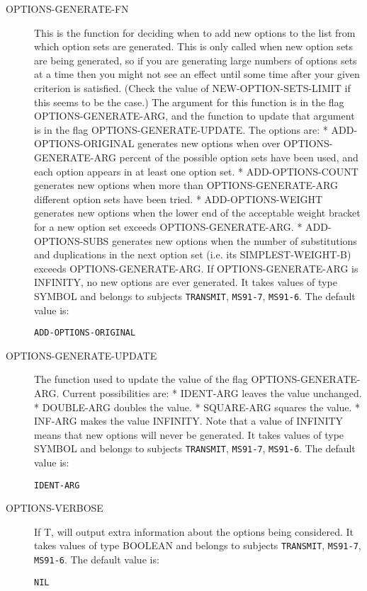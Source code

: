 \begin{description}
\item[OPTIONS-GENERATE-FN]  
This is the function for deciding when to add new options
to the list from which option sets are generated. This is only called 
when new option sets are being generated, so if you are generating large
numbers of options sets at a time then you might not see an effect until
some time after your given criterion is satisfied. (Check the value of
NEW-OPTION-SETS-LIMIT if this seems to be the case.) The argument for 
this function is in the flag OPTIONS-GENERATE-ARG, and the function
to update that argument is in the flag OPTIONS-GENERATE-UPDATE.
The options are:
* ADD-OPTIONS-ORIGINAL generates new options when over 
  OPTIONS-GENERATE-ARG percent of the possible option sets have been 
  used, and each option appears in at least one option set.
* ADD-OPTIONS-COUNT generates new options when more than 
  OPTIONS-GENERATE-ARG different option sets have been tried.
* ADD-OPTIONS-WEIGHT generates new options when the lower end of the
  acceptable weight bracket for a new option set exceeds 
  OPTIONS-GENERATE-ARG.
* ADD-OPTIONS-SUBS generates new options when the number of 
  substitutions and duplications in the next option set (i.e.
  its SIMPLEST-WEIGHT-B) exceeds OPTIONS-GENERATE-ARG.
If OPTIONS-GENERATE-ARG is INFINITY, no new options are ever generated.
It takes values of type SYMBOL and belongs to subjects \texttt{TRANSMIT}, \texttt{MS91-7}, \texttt{MS91-6}.  The default value is: \begin{lstlisting}
ADD-OPTIONS-ORIGINAL
\end{lstlisting}

\item[OPTIONS-GENERATE-UPDATE]  
The function used to update the value of the flag
OPTIONS-GENERATE-ARG. Current possibilities are:
* IDENT-ARG leaves the value unchanged.
* DOUBLE-ARG doubles the value.
* SQUARE-ARG squares the value.
* INF-ARG makes the value INFINITY.
Note that a value of INFINITY means that new options will never be 
generated.
It takes values of type SYMBOL and belongs to subjects \texttt{TRANSMIT}, \texttt{MS91-7}, \texttt{MS91-6}.  The default value is: \begin{lstlisting}
IDENT-ARG
\end{lstlisting}

\item[OPTIONS-VERBOSE]  
If T, will output extra information about the options being 
considered.
It takes values of type BOOLEAN and belongs to subjects \texttt{TRANSMIT}, \texttt{MS91-7}, \texttt{MS91-6}.  The default value is: \begin{lstlisting}
NIL
\end{lstlisting}


\end{description}
